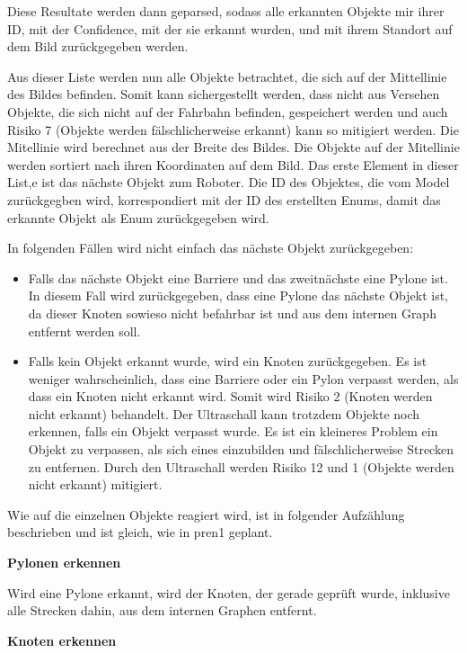 Diese Resultate werden dann geparsed, sodass alle erkannten Objekte mir ihrer ID, mit der Confidence, mit der sie erkannt wurden, und mit ihrem Standort auf dem Bild zurückgegeben werden.

Aus dieser Liste werden nun alle Objekte betrachtet, die sich auf der Mittellinie des Bildes befinden. Somit kann sichergestellt werden, dass nicht aus Versehen Objekte, die sich nicht auf der Fahrbahn befinden, gespeichert werden und auch Risiko 7 (Objekte werden fälschlicherweise erkannt) kann so mitigiert werden. Die Mitellinie wird berechnet aus der Breite des Bildes. Die Objekte auf der Mitellinie werden sortiert nach ihren Koordinaten auf dem Bild. Das erste Element in dieser List,e ist das nächste Objekt zum Roboter. Die ID des Objektes, die vom Model zurückgegben wird, korrespondiert mit der ID des erstellten Enums, damit das erkannte Objekt als Enum zurückgegeben wird.

In folgenden Fällen wird nicht einfach das nächste Objekt zurückgegeben:

\begin{itemize}
    \item Falls das nächste Objekt eine Barriere und das zweitnächste eine Pylone ist. In diesem Fall wird zurückgegeben, dass eine Pylone das nächste Objekt ist, da dieser Knoten sowieso nicht befahrbar ist und aus dem internen Graph entfernt werden soll.
    \item Falls kein Objekt erkannt wurde, wird ein Knoten zurückgegeben. Es ist weniger wahrscheinlich, dass eine Barriere oder ein Pylon verpasst werden, als dass ein Knoten nicht erkannt wird. Somit wird Risiko 2 (Knoten werden nicht erkannt) behandelt. Der Ultraschall kann trotzdem Objekte noch erkennen, falls ein Objekt verpasst wurde. Es ist ein kleineres Problem ein Objekt zu verpassen, als sich eines einzubilden und fälschlicherweise Strecken zu entfernen. Durch den Ultraschall werden Risiko 12 und 1 (Objekte werden nicht erkannt) mitigiert.
\end{itemize}


Wie auf die einzelnen Objekte reagiert wird, ist in folgender Aufzählung beschrieben und ist gleich, wie in \acrshort{pren1} geplant.

\textbf{Pylonen erkennen}

Wird eine Pylone erkannt, wird der Knoten, der gerade geprüft wurde, inklusive alle Strecken dahin, aus dem internen Graphen entfernt.

\textbf{Knoten erkennen}

